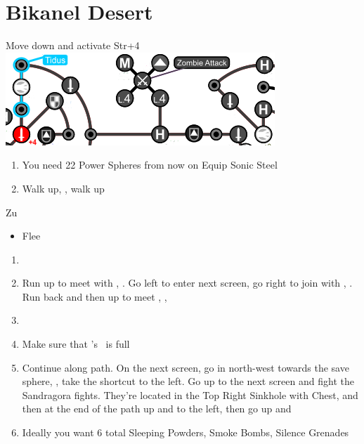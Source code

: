 \chapter{Bikanel Desert}
\begin{spheregrid}
  \begin{itemize}
    \tidusf Move down and activate Str+4
    \includegraphics[width=.8\columnwidth]{graphics/tidus_bikanel}
  \end{itemize}
\end{spheregrid}
\begin{enumerate}
  \item You need 22 Power Spheres from now on
        \tidusf Equip Sonic Steel
  \item Walk up, \sd, walk up
\end{enumerate}
\begin{battle}{Zu}
  \begin{itemize}
    \tidusf Defend
    \tidusf Attack
    \tidusf Defend until all party members arrive
    \item Flee
  \end{itemize}
\end{battle}
\begin{enumerate}[resume]
  \item \sd
  \item Run up to meet with \wakka, \sd. Go left to enter next screen, go right to join with \kimahri, \sd. Run back and then up to meet \rikku, \sd, \save
  \item \formation{\tidus}{\kimahri}{\auron}
  \item Make sure that \rikku's \od\ is full
  \item Continue along path. On the next screen, go in north-west towards the save sphere, \save, take the shortcut to the left. Go up to the next screen and fight the Sandragora fights. They're located in the Top Right Sinkhole with Chest, and then at the end of the path up and to the left, then go up and \sd
  \item Ideally you want 6 total Sleeping Powders, Smoke Bombs, Silence Grenades
\end{enumerate}
